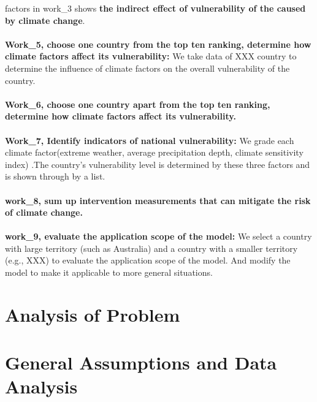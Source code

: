 \documentclass{mcmthesis}
\begin{document}
  factors in work\_3 shows \textbf{the indirect effect of vulnerability of the caused by 
  climate change}.\\\\
  \textbf{Work\_5, choose one country from the top ten ranking, determine how climate 
  factors affect its vulnerability:} We take data of XXX country to determine the 
  influence of climate factors on the overall vulnerability of the country.\\\\ 
  \textbf{Work\_6, choose one country apart from the top ten ranking, determine how 
  climate factors affect its vulnerability.}\\\\
  \textbf{Work\_7, Identify indicators of national vulnerability:} We grade each 
  climate factor(extreme weather, average precipitation depth, climate 
  sensitivity index) .The country's vulnerability level is determined 
  by these three factors and is shown through by a list.\\\\
  \textbf{work\_8, sum up intervention measurements that can mitigate the risk of climate change.}\\\\
  \textbf{work\_9, evaluate the application scope of the model:} We select a country with large 
  territory (such as Australia) and a country with a smaller territory (e.g., 
  XXX) to evaluate the application scope of the model. And modify the model 
  to make it applicable to more general situations.
\section{Analysis of Problem}

\section{General Assumptions and Data Analysis}
\end{document}
